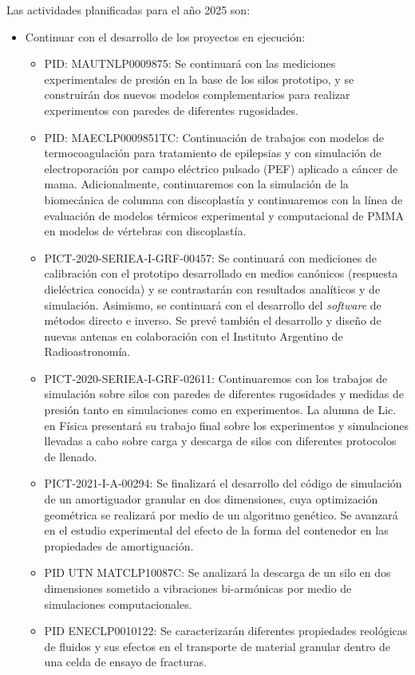 \documentclass[a4paper,11pt,twoside,final,titlepage,onecolumn,openright]{report}
\begin{document}
Las actividades planificadas para el año 2025 son:

\begin{itemize}
\item Continuar con el desarrollo de los proyectos en ejecución:
    \begin{itemize}
\item PID: MAUTNLP0009875: Se continuará con las mediciones experimentales de presión en la base de los silos prototipo, y se construirán dos nuevos modelos complementarios para realizar experimentos con paredes de diferentes rugosidades. 
 \item PID: MAECLP0009851TC: Continuación de trabajos con modelos de termocoagulación para tratamiento de epilepsias y con simulación de electroporación por campo eléctrico pulsado (PEF) aplicado a cáncer de mama. Adicionalmente, continuaremos con la simulación de la biomecánica de columna con discoplastía y continuaremos con la línea de evaluación  de modelos térmicos experimental y computacional de PMMA en modelos de vértebras con discoplastía.
\item PICT-2020-SERIEA-I-GRF-00457: Se continuará con mediciones de calibración con el prototipo desarrollado en medios canónicos (respuesta dieléctrica conocida) y se contrastarán con resultados analíticos y de simulación. Asimismo, se continuará con el desarrollo del \textit{software} de métodos directo e inverso. Se prevé también el desarrollo y diseño de nuevas antenas en colaboración con el Instituto Argentino de Radioastronomía.
\item PICT-2020-SERIEA-I-GRF-02611: Continuaremos con los trabajos de simulación sobre silos con paredes de diferentes rugosidades y medidas de presión tanto en simulaciones como en experimentos. La alumna de Lic. en Física presentará su trabajo final sobre los experimentos y simulaciones llevadas a cabo sobre carga y descarga de silos con diferentes protocolos de llenado.
\item PICT-2021-I-A-00294: Se finalizará el desarrollo del código de simulación de un amortiguador granular en dos dimensiones, cuya optimización geométrica se realizará por medio de un algoritmo genético. Se avanzará en el estudio experimental del efecto de la forma del contenedor en las propiedades de amortiguación.
\item PID UTN MATCLP10087C: Se analizará la descarga de un silo en dos dimensiones sometido a vibraciones bi-armónicas por medio de simulaciones computacionales.
\item PID ENECLP0010122: Se caracterizarán diferentes propiedades reológicas de fluidos y sus efectos en el transporte de material granular dentro de una celda de ensayo de fracturas.

\end{itemize}
\end{itemize}
\end{document}
